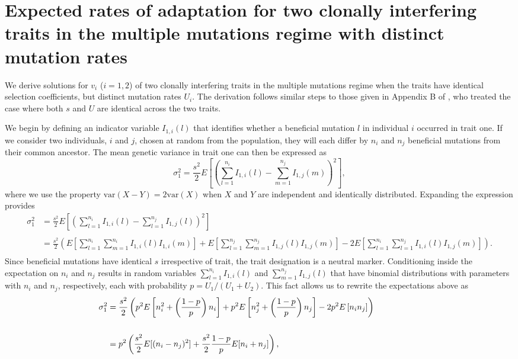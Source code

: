 \documentclass[11pt,onecolumn]{article}
\begin{document}
\section{Expected rates of adaptation for two clonally interfering traits in the multiple mutations regime with distinct mutation rates} \label{sec:app:elastVcontours}
We derive solutions for $v_i$ ($i=1,2$) of two clonally interfering traits in the multiple mutations regime when the traits have identical selection coefficients, but distinct mutation rates $U_i$. The derivation follows similar steps to those given in Appendix B of \citet{gomez2019directional}, who treated the case where both $s$ and $U$ are identical across the two traits.

We begin by defining an indicator variable $I_{1,i}(l)$ that identifies whether a beneficial mutation $l$ in individual $i$ occurred in trait one. If we consider two individuals, $i$ and $j$, chosen at random from the population, they will each differ by $n_i$ and $n_j$ beneficial mutations from their common ancestor. The mean genetic variance in trait one can then be expressed as
\[
\sigma_1^2 = \frac{s^2}{2}E\left[\left(\sum_{l=1}^{n_i}I_{1,i}(l) - \sum_{m=1}^{n_j}I_{1,j}(m) \right)^2\right],
\]
where we use the property $\text{var}(X-Y)=2\text{var}(X)$ when $X$ and $Y$ are independent and identically distributed. Expanding the expression provides
\[
\begin{aligned}
\sigma_1^2 &=\frac{s^2}{2}E\left[\left(\sum_{l=1}^{n_i} I_{1,i}(l) - \sum_{l=1}^{n_j} I_{1,j}(l)\right)^2 \right] \\
\\
&=\frac{s^2}{2} \left( E\left[ \sum_{l=1}^{n_i} \sum_{m=1}^{n_i} I_{1,i}(l)I_{1,i}(m)\right]+E\left[\sum_{l=1}^{n_j} \sum_{m=1}^{n_j} I_{1,j}(l)I_{1,j}(m) \right] - 2 E\left[\sum_{l=1}^{n_i} \sum_{l=1}^{n_j} I_{1,i}(l) I_{1,j}(m)\right] \right). \\
&
\end{aligned}
\]
Since beneficial mutations have identical $s$ irrespective of trait, the trait designation is a neutral marker. Conditioning inside the expectation on $n_i$ and $n_j$ results in random variables $\sum_{l=1}^{n_i}I_{1,i}(l)$ and $\sum_{m=1}^{n_j}I_{1,j}(l)$ that have binomial distributions with parameters with $n_i$ and $n_j$, respectively, each with probability $p = U_1/(U_1+U_2)$. This fact allows us to rewrite the expectations above as
\[
\begin{aligned}
\sigma_1^2 &= \frac{s^2}{2}\left( p^2 E\left[ n_i^2+\left(\frac{1-p}{p}\right)n_i\right]+ p^2 E\left[n_j^2+\left(\frac{1-p}{p}\right)n_j \right] - 2 p^2 E\left[ n_i n_j \right] \right) \hspace{0.63in} \\
\\
&=p^2 \left(\frac{s^2}{2} E[(n_i-n_j)^2] + \frac{s^2}{2}\frac{1-p}{p}E[n_i+n_j] \right), &
\end{aligned}
\]
\end{document}
